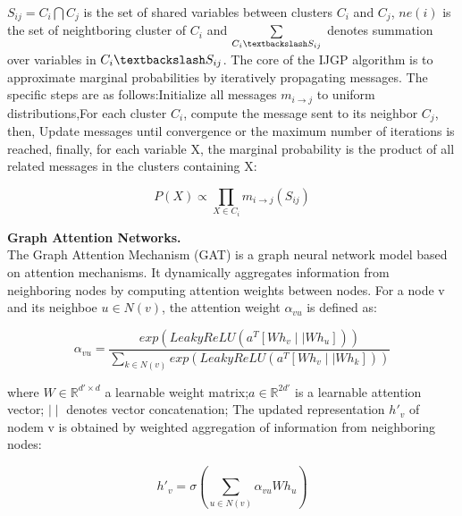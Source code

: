 \(S_{ij}=C_i\bigcap C_j\) is the set of shared variables between clusters \(C_i\) and \(C_j\),  
\(ne(i)\) is the set of neightboring cluster of \(C_i\) and \(\sum\limits_{C_i\textbackslash S_{ij}}\) 
denotes summation over variables in \(C_i\textbackslash S_{ij}\).
The core of the IJGP algorithm is to approximate marginal probabilities by iteratively propagating 
messages. The specific steps are as follows:Initialize all messages \(m_{i\rightarrow j}\) to uniform 
distributions,For each cluster \(C_i\), compute the message sent to its neighbor \(C_j\), then, 
Update messages until convergence or the maximum number of iterations is reached, finally, for each 
variable X, the marginal probability is the product of all related messages in the clusters containing X:

\begin{equation}
P(X)\propto\prod\limits_{X\in C_i}m_{i\rightarrow j}(S_{ij})
\end{equation}

\textbf{Graph Attention Networks.}\\
The Graph Attention Mechanism (GAT) is a graph neural network model based on attention mechanisms. 
It dynamically aggregates information from neighboring nodes by computing attention weights between nodes.
For a node v and its neighboe \(u \in N(v)\), the attention weight \(\alpha_{vu}\) is defined as:

\begin{equation}
\alpha_{vu}=\frac{exp(LeakyReLU(a^T[Wh_v\mid\mid Wh_u]))}{\sum\limits_{k\in N(v)}exp
(LeakyReLU(a^T[Wh_v\mid\mid Wh_k]))}
\end{equation}

where \(W\in \mathbb{R}^{d'\times d}\) a learnable weight matrix;\(a\in \mathbb{R}^{2d'}\) is a 
learnable attention vector; \(\mid\mid\) denotes vector concatenation; 
The updated representation \(h'_v\) of nodem v is obtained by weighted aggregation of information 
from neighboring nodes:

\begin{equation}
h'_v=\sigma(\sum\limits_{u\in N(v)}\alpha_{vu} Wh_u)
\end{equation}
